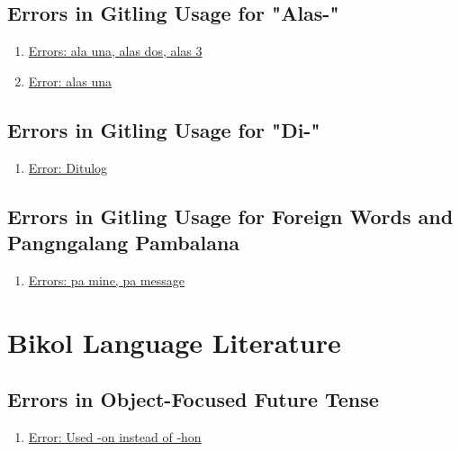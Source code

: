 \subsection{Errors in Gitling Usage for "Alas-"}

\begin{enumerate}
    \item \href{https://www.facebook.com/story.php/?story_fbid=1295438683977541&id=1109330399255038&_rdr}{Errors: ala una, alas dos, alas 3}
    \item \href{https://www.instagram.com/starsalon_aesthetics/p/DEq4K39SCT_/}{Error: alas una}
\end{enumerate}

\subsection{Errors in Gitling Usage for "Di-"}

\begin{enumerate}
    \item \href{https://www.facebook.com/share/p/1XLwWpBFJW/}{Error: Ditulog}
    
\end{enumerate}

\subsection{Errors in Gitling Usage for Foreign Words and Pangngalang Pambalana}

\begin{enumerate}
    \item \href{https://www.facebook.com/groups/2121876361169013/posts/9651859028170671/}{Errors: pa mine, pa message}
\end{enumerate}

\section{Bikol Language Literature}

\subsection{Errors in Object-Focused Future Tense}
\begin{enumerate}
    \item \href{https://www.reddit.com/r/Bicol/comments/1gai74l/ano_ang_dapat_gibuon_kung_nabaha_an_sakyan_mo/}{Error: Used -on instead of -hon}
\end{enumerate}

